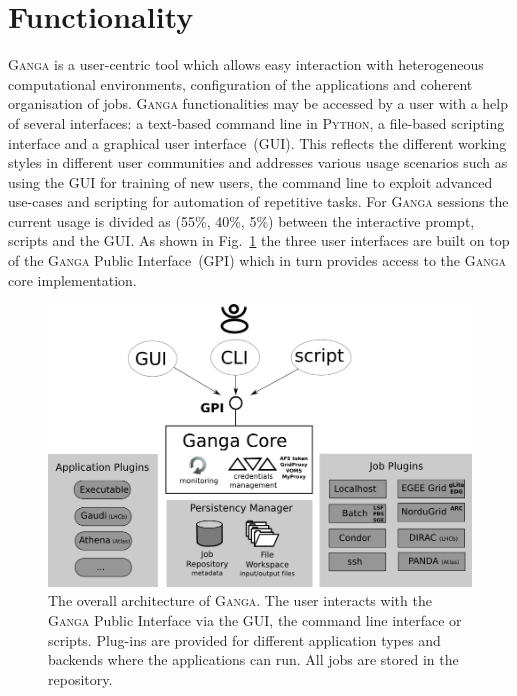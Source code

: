\documentclass{elsart}
\def\ganga {\textsc{Ganga}\xspace}
\def\python {\textsc{Python}\xspace}
\def\GPI{GPI\xspace}
\begin{document}
\section{Functionality}
\label{sec:functionality}
\ganga is a user-centric tool which allows easy interaction with heterogeneous
computational environments, configuration of the applications and coherent
organisation of jobs. \ganga functionalities may be accessed by a user with a
help of several interfaces: a text-based command line in \python, a file-based
scripting interface and a graphical user interface~(GUI). This reflects the different
working styles in different user communities and addresses various usage
scenarios such as using the GUI for training of new users, the command line to
exploit advanced use-cases and scripting for automation of repetitive tasks.
For \ganga sessions the current usage is divided as (55\%, 40\%, 5\%) between
the interactive prompt, scripts and the GUI. As shown in
Fig.~\ref{fig:GPI_architecture} the three user interfaces are built on top of
the \ganga Public Interface~(\GPI) which in turn provides access to the \ganga
core implementation.
\begin{figure}[htbp]
  \centering
  \includegraphics[width=14cm]{ganga-architecture.png}
  \caption{The overall architecture of \ganga. The user interacts with the
    \ganga Public Interface via the GUI, the command line interface or
    scripts. Plug-ins are provided for different application types and
    backends where the applications can run. All jobs are stored in the
    repository.}
  \label{fig:GPI_architecture}
\end{figure}
\end{document}
